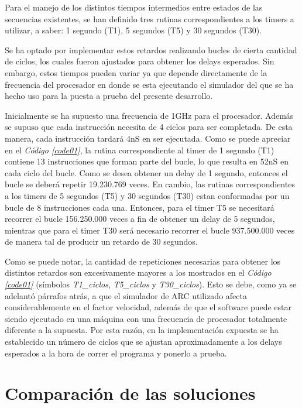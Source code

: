 \documentclass{article}
\newcommand{\refcode}[1]{\textit{Código \ref{#1}}}
\begin{document}
	Para el manejo de los distintos tiempos intermedios entre estados de las secuencias existentes, se han definido tres rutinas correspondientes a los timers a utilizar, a saber: 1 segundo (T1), 5 segundos (T5) y 30 segundos (T30).
	\par
	Se ha optado por implementar estos retardos realizando bucles de cierta cantidad de ciclos, los cuales fueron ajustados para obtener los delays esperados. Sin embargo, estos tiempos pueden variar ya que depende directamente de la frecuencia del procesador en donde se esta ejecutando el simulador del que se ha hecho uso para la puesta a prueba del presente desarrollo.
	\par
	Inicialmente se ha supuesto una frecuencia de 1GHz para el procesador. Además se supuso que cada instrucción necesita de 4 ciclos para ser completada. De esta manera, cada instrucción tardará 4nS en ser ejecutada. Como se puede apreciar en el \refcode{code01}, la rutina correspondiente al timer de 1 segundo (T1) contiene 13 instrucciones que forman parte del bucle, lo que resulta en 52nS en cada ciclo del bucle. Como se desea obtener un delay de 1 segundo, entonces el bucle se deberá repetir 19.230.769 veces. En cambio, las rutinas correspondientes a los timers de 5 segundos (T5) y 30 segundos (T30) estan conformadas por un bucle de 8 instrucciones cada una. Entonces, para el timer T5 se necesitará recorrer el bucle 156.250.000 veces a fin de obtener un delay de 5 segundos, mientras que para el timer T30 será necesario recorrer el bucle 937.500.000 veces de manera tal de producir un retardo de 30 segundos.
	\par
	Como se puede notar, la cantidad de repeticiones necesarias para obtener los distintos retardos son excesivamente mayores a los mostrados en el \refcode{code01} (símbolos \textit{T1\_ciclos}, \textit{T5\_ciclos} y \textit{T30\_ciclos}). Esto se debe, como ya se adelantó párrafos atrás, a que el simulador de ARC utilizado afecta considerablemente en el factor velocidad, además de que el software puede estar siendo ejecutado en una máquina con una frecuencia de procesador totalmente diferente a la supuesta. Por esta razón, en la implementación expuesta se ha establecido un número de ciclos que se ajustan aproximadamente a los delays esperados a la hora de correr el programa y ponerlo a prueba. 
	\bigskip\bigskip




\section{Comparación de las soluciones}
\medskip
\end{document}
